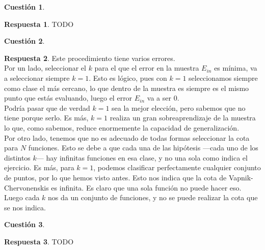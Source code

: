 \documentclass[10pt,a4paper]{article}
\theoremstyle{definition}
\newtheorem{cuestion}{Cuestión}
\newtheorem*{respuesta}{Respuesta}
\begin{document}
\begin{cuestion}
\end{cuestion}
\begin{respuesta}
TODO
\end{respuesta}

\begin{cuestion}
\end{cuestion}
\begin{respuesta}
Este procedimiento tiene varios errores.\\

Por un lado, seleccionar el $k$ para el que el error en la muestra $E_{in}$ es mínima, va a seleccionar siempre $k=1$. Esto es lógico, pues con $k=1$ seleccionamos siempre como clase el más cercano, lo que dentro de la muestra es siempre es el mismo punto que estás evaluando, luego el error $E_{in}$ va a ser 0.\\

Podría pasar que de verdad $k=1$ sea la mejor elección, pero sabemos que no tiene porque serlo. Es más, $k=1$ realiza un gran sobreaprendizaje de la muestra lo que, como sabemos, reduce enormemente la capacidad de generalización.\\
  
Por otro lado, tenemos que no es adecuado de todas formas seleccionar la cota para $N$ funciones. Esto se debe a que cada una de las hipótesis ---cada uno de los distintos $k$--- hay infinitas funciones en esa clase, y no una sola como indica el ejercicio. Es más, para $k=1$, podemos clasificar perfectamente cualquier conjunto de puntos, por lo que hemos visto antes. Esto nos indica que la cota de Vapnik-Chervonenskis es infinita. Es claro que una sola función no puede hacer eso. Luego cada $k$ nos da un conjunto de funciones, y no se puede realizar la cota que se nos indica.\\
  
\end{respuesta}

\begin{cuestion}
\end{cuestion}
\begin{respuesta}
TODO
\end{respuesta}
\end{document}
